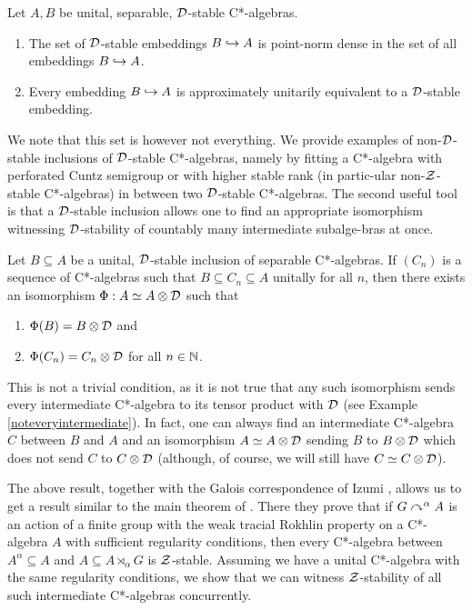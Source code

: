 \documentclass[12pt]{amsart}
\begin{document}
\begin{result}
    Let $A,B$ be unital, separable, $\mathcal{D}$-stable C*-algebras.
      \begin{enumerate}
        \item The set of $\mathcal{D}$-stable embeddings $B \hookrightarrow A$ is point-norm dense in the set of all embeddings $B \hookrightarrow A$.
        \item Every embedding $B \hookrightarrow A$ is approximately unitarily equivalent to a $\mathcal{D}$-stable embedding. 
      \end{enumerate}
  \end{result}

  We note that this set is however not everything. We provide examples of non-$\mathcal{D}$-stable inclusions of $\mathcal{D}$-stable C*-algebras, namely by fitting a C*-algebra with perforated Cuntz semigroup or with higher stable rank (in partic\hyp{}ular non-$\mathcal{Z}$-stable C*-algebras) in between two $\mathcal{D}$-stable C*-algebras. The second useful tool is that a $\mathcal{D}$-stable inclusion allows one to find an appropriate isomorphism witnessing $\mathcal{D}$-stability of countably many intermediate subalge\hyp{}bras at once.


\begin{result}
    Let $B \subseteq A$ be a unital, $\mathcal{D}$-stable inclusion of separable C*-algebras. If $(C_n)$ is a sequence of C*-algebras such that $B \subseteq C_n \subseteq A$ unitally for all $n$, then there exists an isomorphism $\Phi: A \simeq A \otimes \mathcal{D}$ such that
      \begin{enumerate}
        \item $\Phi(B) = B \otimes \mathcal{D}$ and 
        \item $\Phi(C_n) = C_n \otimes \mathcal{D}$ for all $n \in \mathbb{N}$. 
      \end{enumerate}
  \end{result}
This is not a trivial condition, as it is not true that any such isomorphism sends every intermediate C*-algebra to its tensor product with $\mathcal{D}$ (see Example \ref{noteveryintermediate}). In fact, one can always find an intermediate C*-algebra $C$ between $B$ and  $A$ and an isomorphism $A \simeq A \otimes \mathcal{D}$ sending $B$ to $B \otimes \mathcal{D}$ which does not send $C$ to $C \otimes \mathcal{D}$ (although, of course, we will still have $C \simeq C \otimes \mathcal{D}$). 

The above result, together with the Galois correspondence of Izumi \cite{Izumi02}, allows us to get a result similar to the main theorem of \cite{AGJP22}. There they prove that if $G \curvearrowright^\alpha A$ is an action of a finite group with the weak tracial Rokhlin property on a C*-algebra $A$ with sufficient regularity conditions, then every C*-algebra between $A^\alpha \subseteq A$ and $A \subseteq A \rtimes_\alpha G$ is $\mathcal{Z}$-stable. Assuming we have a unital C*-algebra with the same regularity conditions, we show that we can witness $\mathcal{Z}$-stability of all such intermediate C*-algebras concurrently. 
\end{document}
